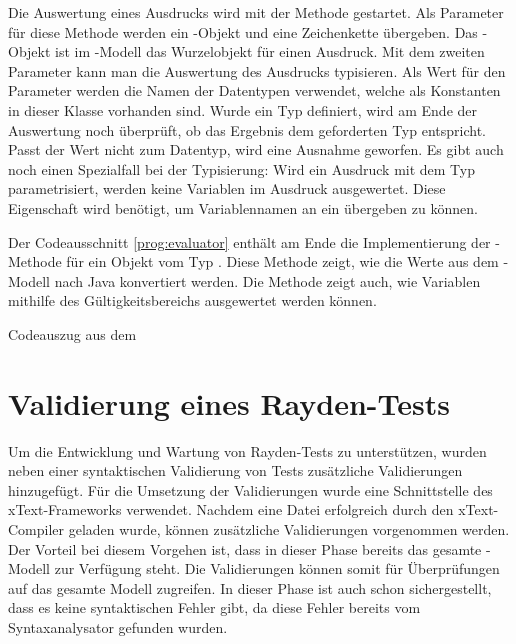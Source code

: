 \SuperPar
Die Auswertung eines Ausdrucks wird mit der Methode  gestartet. Als Parameter für diese Methode werden ein -Objekt und eine Zeichenkette übergeben. Das -Objekt ist im -Modell das Wurzelobjekt für einen Ausdruck. Mit dem zweiten Parameter  kann man die Auswertung des Ausdrucks typisieren. Als Wert für den Parameter  werden die Namen der Datentypen verwendet, welche als Konstanten in dieser Klasse vorhanden sind. Wurde ein Typ definiert, wird am Ende der Auswertung noch überprüft, ob das Ergebnis dem geforderten Typ entspricht. Passt der Wert nicht zum Datentyp, wird eine Ausnahme geworfen. Es gibt auch noch einen Spezialfall bei der Typisierung: Wird ein Ausdruck mit dem Typ  parametrisiert, werden keine Variablen im Ausdruck ausgewertet. Diese Eigenschaft wird benötigt, um Variablennamen an ein  übergeben zu können.

\SuperPar
Der Codeausschnitt \ref{prog:evaluator} enthält am Ende die Implementierung der -Methode für ein Objekt vom Typ . Diese Methode zeigt, wie die Werte aus dem -Modell nach Java konvertiert werden. Die Methode zeigt auch, wie Variablen mithilfe des Gültigkeitsbereichs ausgewertet werden können.

\begin{program}

\caption{Codeauszug aus dem }
\label{prog:evaluator}
\end{program}

\clearpage
\section{Validierung eines Rayden-Tests}
\label{cha:validateKeyword}

Um die Entwicklung und Wartung von Rayden-Tests zu unterstützen, wurden neben einer syntaktischen Validierung von Tests zusätzliche Validierungen hinzugefügt. Für die Umsetzung der Validierungen wurde eine Schnittstelle des xText-Frameworks verwendet. Nachdem eine Datei erfolgreich durch den xText-Compiler geladen wurde, können zusätzliche Validierungen vorgenommen werden. Der Vorteil bei diesem Vorgehen ist, dass in dieser Phase bereits das gesamte -Modell zur Verfügung steht. Die Validierungen können somit für Überprüfungen auf das gesamte Modell zugreifen. In dieser Phase ist auch schon sichergestellt, dass es keine syntaktischen Fehler gibt, da diese Fehler bereits vom Syntaxanalysator gefunden wurden.

